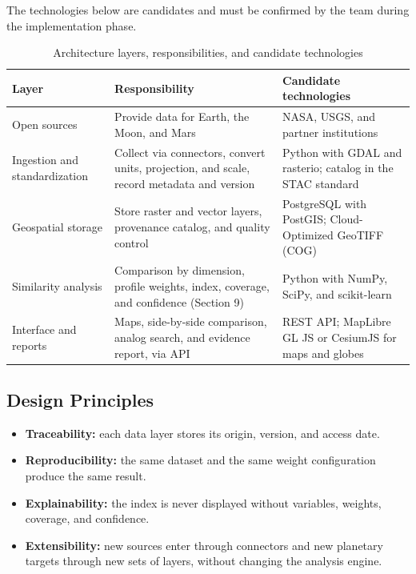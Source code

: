 \documentclass[12pt,letterpaper]{article}
\begin{document}
The technologies below are candidates and must be confirmed by the team during the implementation phase.

\begin{table}[htbp]
\centering
\caption{Architecture layers, responsibilities, and candidate technologies}
\small
\begin{tabularx}{\textwidth}{>{\raggedright\arraybackslash}p{3.0cm} >{\raggedright\arraybackslash}X >{\raggedright\arraybackslash}X}
\toprule
\textbf{Layer} & \textbf{Responsibility} & \textbf{Candidate technologies} \\
\midrule
Open sources & Provide data for Earth, the Moon, and Mars & NASA, USGS, and partner institutions \\
Ingestion and standardization & Collect via connectors, convert units, projection, and scale, record metadata and version & Python with GDAL and rasterio; catalog in the STAC standard \\
Geospatial storage & Store raster and vector layers, provenance catalog, and quality control & PostgreSQL with PostGIS; Cloud-Optimized GeoTIFF (COG) \\
Similarity analysis & Comparison by dimension, profile weights, index, coverage, and confidence (Section 9) & Python with NumPy, SciPy, and scikit-learn \\
Interface and reports & Maps, side-by-side comparison, analog search, and evidence report, via API & REST API; MapLibre GL JS or CesiumJS for maps and globes \\
\bottomrule
\end{tabularx}
\end{table}

\subsection{Design Principles}

\begin{itemize}
  \item \textbf{Traceability:} each data layer stores its origin, version, and access date.
  \item \textbf{Reproducibility:} the same dataset and the same weight configuration produce the same result.
  \item \textbf{Explainability:} the index is never displayed without variables, weights, coverage, and confidence.
  \item \textbf{Extensibility:} new sources enter through connectors and new planetary targets through new sets of layers, without changing the analysis engine.
\end{itemize}
\end{document}
